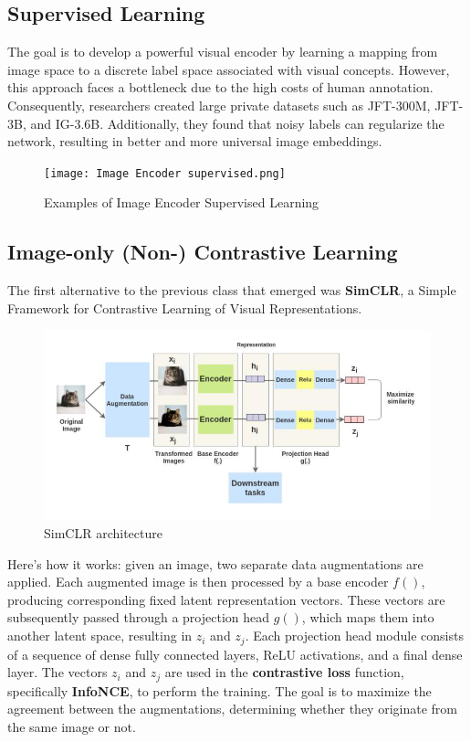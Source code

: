 \subsection{Supervised Learning}

The goal is to develop a powerful visual encoder by learning a mapping from image space to a discrete label space associated with visual concepts. However, this approach faces a bottleneck due to the high costs of human annotation. Consequently, researchers created large private datasets such as JFT-300M, JFT-3B, and IG-3.6B. Additionally, they found that noisy labels can regularize the network, resulting in better and more universal image embeddings.

\begin{figure}[H]
    \centering
    \texttt{[image: Image Encoder supervised.png]}
    \caption{Examples of Image Encoder Supervised Learning}
    \label{fig:Image-encoder-supervised}
\end{figure}

\subsection{Image-only (Non-) Contrastive Learning}

The first alternative to the previous class that emerged was \textbf{SimCLR}, a Simple Framework for Contrastive Learning of Visual Representations.


\begin{figure}[H]
    \centering
    \includegraphics[width=0.75\linewidth]{tikz/SimCLR.png}
    \caption{SimCLR architecture}
    \label{fig:enter-label}
\end{figure}

Here's how it works: given an image, two separate data augmentations are applied. Each augmented image is then processed by a base encoder $f()$, producing corresponding fixed latent representation vectors. These vectors are subsequently passed through a projection head $g()$, which maps them into another latent space, resulting in $ z_i$ and $ z_j $. Each projection head module consists of a sequence of dense fully connected layers, ReLU activations, and a final dense layer. The vectors $z_i $ and $z_j$ are used in the \textbf{contrastive loss} function, specifically \textbf{InfoNCE}, to perform the training. The goal is to maximize the agreement between the augmentations, determining whether they originate from the same image or not.


